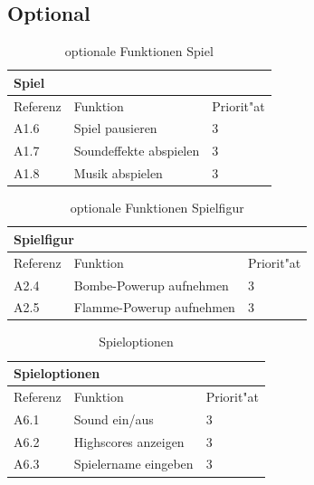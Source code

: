 \subsection{Optional}


\begin{table}[H]
  \begin{center}
    \begin{tabular}{|p{20mm}|p{85mm}|p{20mm}|}
    \multicolumn{3}{l}{\textbf{Spiel}} \\
    \hline Referenz & Funktion & Priorit"at \\
    \hline A1.6 & Spiel pausieren & 3 \\
    \hline A1.7 & Soundeffekte abspielen & 3 \\
    \hline A1.8 & Musik abspielen & 3 \\
    \hline
    \end{tabular}
  \end{center}
  \caption{optionale Funktionen Spiel}
\end{table}



\begin{table}[H]
  \begin{center}
    \begin{tabular}{|p{20mm}|p{85mm}|p{20mm}|}
    \multicolumn{3}{l}{\textbf{Spielfigur}} \\
    \hline Referenz & Funktion & Priorit"at \\
    \hline A2.4 & Bombe-Powerup aufnehmen & 3 \\
    \hline A2.5 & Flamme-Powerup aufnehmen & 3 \\
    \hline
    \end{tabular}
  \end{center}
  \caption{optionale Funktionen Spielfigur}
\end{table}


\begin{table}[H]
  \begin{center}
    \begin{tabular}{|p{20mm}|p{85mm}|p{20mm}|}
    \multicolumn{3}{l}{\textbf{Spieloptionen}} \\
    \hline Referenz & Funktion & Priorit"at \\
    \hline A6.1 & Sound ein/aus & 3 \\
    \hline A6.2 & Highscores anzeigen & 3 \\
    \hline A6.3 & Spielername eingeben & 3 \\
    \hline
    \end{tabular}
  \end{center}
  \caption{Spieloptionen}
\end{table}


